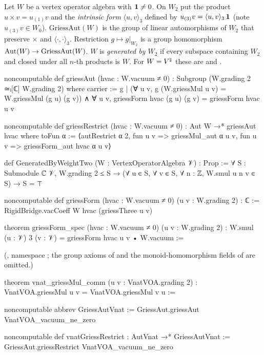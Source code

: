 \begin{definition}\label{ch20:def:griessaut}
Let $W$ be a vertex operator algebra with $\mathbf 1\neq0$.  On $W_2$ put the product $u\times v=u_{(1)}v$ and the
\emph{intrinsic form} $\langle u,v\rangle_3$ defined by $u_{(3)}v=\langle u,v\rangle_3\,\mathbf 1$ (note
$u_{(3)}v\in W_0$).  $\mathrm{GriessAut}(W)$ is the group of linear automorphisms of $W_2$ that preserve $\times$ and
$\langle\cdot,\cdot\rangle_3$.  Restriction $g\mapsto g|_{W_2}$ is a group homomorphism
$\operatorname{Aut}(W)\to\mathrm{GriessAut}(W)$.  $W$ is \emph{generated by $W_2$} if every subspace containing $W_2$ and closed
under all $n$-th products is $W$.  For $W={V^{\natural}}$ these are  and .
\end{definition}
\begin{leancode}
noncomputable def griessAut (hvac : W.vacuum ≠ 0) : Subgroup (W.grading 2 ≃ₗ[ℂ] W.grading 2) where
  carrier := {g | (∀ u v, g (W.griessMul u v) = W.griessMul (g u) (g v)) ∧
    ∀ u v, griessForm hvac (g u) (g v) = griessForm hvac u v}

noncomputable def griessRestrict (hvac : W.vacuum ≠ 0) : Aut W →* griessAut hvac where
  toFun α := ⟨autRestrict α 2, fun u v => griessMul_aut α u v, fun u v => griessForm_aut hvac α u v⟩

def GeneratedByWeightTwo (W : VertexOperatorAlgebra 𝒱) : Prop :=
  ∀ S : Submodule ℂ 𝒱, W.grading 2 ≤ S → (∀ u ∈ S, ∀ v ∈ S, ∀ n : ℤ, W.smul u n v ∈ S) → S = ⊤

noncomputable def griessForm (hvac : W.vacuum ≠ 0) (u v : W.grading 2) : ℂ :=
  RigidBridge.vacCoeff W hvac (griessThree u v)

theorem griessForm_spec (hvac : W.vacuum ≠ 0) (u v : W.grading 2) :
    W.smul (u : 𝒱) 3 (v : 𝒱) = griessForm hvac u v • W.vacuum :=
\end{leancode}
(, namespace ; the group axioms of 
and the monoid-homomorphism fields of  are omitted.)
\begin{leancode}
theorem vnat_griessMul_comm (u v : VnatVOA.grading 2) :
    VnatVOA.griessMul u v = VnatVOA.griessMul v u :=

noncomputable abbrev GriessAutVnat := GriessAut.griessAut VnatVOA_vacuum_ne_zero

noncomputable def vnatGriessRestrict : AutVnat →* GriessAutVnat :=
  GriessAut.griessRestrict VnatVOA_vacuum_ne_zero
\end{leancode}
